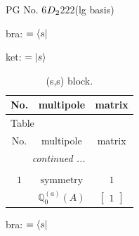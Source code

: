 \documentclass[fleqn,8pt,landscape]{jsarticle}
\begin{document}
\setcounter{MaxMatrixCols}{32}

\renewcommand{\tablename}{Table~}
\renewcommand{\figurename}{Figure~}
\begin{center}
\LARGE
PG No. 6\quad$D_{\rm 2}$\quad$222$\quad[ orthorhombic ] (lg basis)
\end{center}
bra: $=\bra{s}$

\noindent
ket: $=\ket{s}$
\renewcommand{\arraystretch}{1.6}
\begin{longtable}{ccc}
\caption{(s,s) block.}
 \\
 \hline \hline
No. & multipole & matrix \\ \hline \endfirsthead

\multicolumn{2}{l}{\tablename\ \thetable{}} \\
 \hline \hline
No. & multipole & matrix \\ \hline \endhead

 \hline \hline
\multicolumn{2}{r}{\footnotesize\it continued ...} \\ \endfoot

 \hline \hline
\multicolumn{2}{r}{} \\ \endlastfoot

$ 1 $ & $ \text{symmetry} $ & $ 1 $ \\
$  $ & $ \mathbb{Q}_{0}^{(a)}(A) $ & $ \begin{bmatrix} 1 \end{bmatrix} $ \\ \hline
\end{longtable}
bra: $=\bra{s}$
\end{document}
